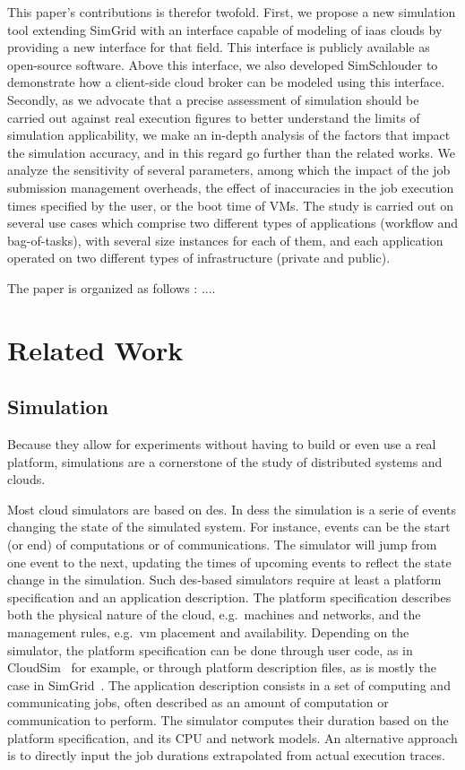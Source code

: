 \documentclass[a4paper,10pt]{article}
\begin{document}
This  paper's  contributions  is  therefor  twofold. First,  we  propose  a  new
simulation  tool extending  SimGrid with  an  interface capable  of modeling  of
\ac{iaas} clouds by providing a new  interface for that field. This interface is
publicly  available as  open-source  software.  Above  this  interface, we  also
developed  SimSchlouder to  demonstrate how  a client-side  cloud broker  can be
modeled using this interface.
%
Secondly,  as we  advocate that  a precise  assessment of  simulation should  be
carried out  against real execution figures  to better understand the  limits of
simulation  applicability, we  make an  in-depth  analysis of  the factors  that
impact the simulation  accuracy, and in this regard go  further than the related
works. We analyze the sensitivity of  several parameters, among which the impact
of the  job submission management overheads,  the effect of inaccuracies  in the
job execution times specified  by the user, or the boot time  of VMs.  The study
is  carried out  on several  use  cases which  comprise two  different types  of
applications (workflow and  bag-of-tasks), with several size  instances for each
of them, and each application operated  on two different types of infrastructure
(private and public).


The paper is organized as follows : ....


\section{Related Work}

\subsection{Simulation}

Because they allow for experiments without having to build or even use a real 
platform, simulations are a cornerstone of the study of distributed
systems and clouds.  

Most cloud simulators  are based on \ac{des}. In \aclp{des}  the simulation is a
serie  of events  changing the  state of  the simulated  system.  For  instance,
events can  be the  start (or  end) of computations  or of  communications.  The
simulator will jump from  one event to the next, updating  the times of upcoming
events  to reflect  the state  change  in the  simulation.  Such  \ac{des}-based
simulators  require  at  least  a  platform  specification  and  an  application
description.  The platform  specification describes both the  physical nature of
the cloud,  e.g.~machines and networks,  and the management  rules, e.g.~\ac{vm}
placement  and   availability.   Depending   on  the  simulator,   the  platform
specification can be done through  user code, as in CloudSim~\cite{cloudsim} for
example,  or through  platform  description  files, as  is  mostly  the case  in
SimGrid~\cite{simgrid}.   The  application  description  consists in  a  set  of
computing and communicating  jobs, often described as an  amount of computation
or communication to perform. The simulator  computes their duration based on the
platform specification, and its CPU and network models.  An alternative approach
is  to directly  input the  job  durations extrapolated  from actual  execution
traces.
\end{document}
